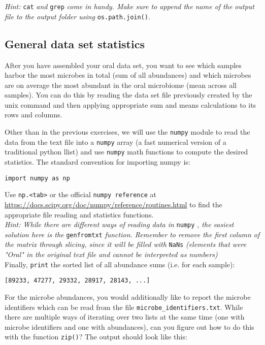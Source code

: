 \documentclass[12pt]{article}
\begin{document}
\noindent\emph{Hint:} \texttt{cat} \emph{and} \texttt{grep} \emph{come in handy. Make sure to append the name of the output file to the output folder using} \texttt{os.path.join()}.

\subsection{General data set statistics}

After you have assembled your oral data set, you want to see which samples harbor the most microbes in total (sum of all abundances) and which microbes are on average the most abundant in the oral microbiome (mean across all samples). You can do this by reading the data set file previously created by the unix command and then applying appropriate sum and means calculations to its rows and columns.

 Other than in the previous exercises, we will use the  \texttt{numpy} module to read the data from the text file into a \texttt{numpy} array (a fast numerical version of a traditional python llist) and use \texttt{numpy} math functions to compute the desired statistics. The standard convention for importing numpy is:

\begin{verbatim}
import numpy as np
\end{verbatim}

Use \texttt{np.<tab>} or the official \texttt{numpy reference} at \url{https://docs.scipy.org/doc/numpy/reference/routines.html} to find the appropriate file reading and statistics functions.\\

\noindent\emph{Hint: While there are different ways of reading data in} \texttt{numpy} \emph{, the easiest solution here is the} \texttt{genfromtxt} \emph{function. Remember to remove the first column of the matrix through slicing, since it will be filled with} \texttt{NaNs} \emph{(elements that were "Oral" in the original text file and cannot be interpreted as numbers)}\\
  
Finally, \texttt{print} the sorted list of all abundance sums (i.e. for each sample):
 
\begin{verbatim}
[89233, 47277, 29332, 28917, 28143, ...]
\end{verbatim}

For the microbe abundances, you would additionally like to report the microbe identifiers which can be read from the file \texttt{microbe\_identifiers.txt}. While there are multiple ways of iterating over two lists at the same time (one with microbe identifiers and one with abundances), can you figure out how to do this with the function \texttt{zip()}? The output should look like this:
\end{document}
